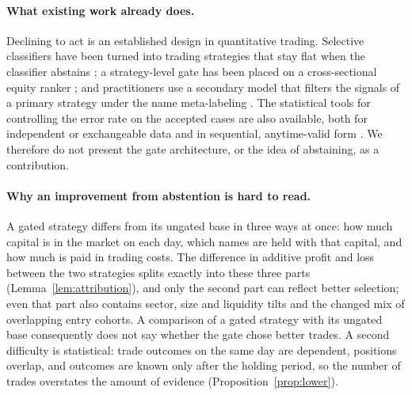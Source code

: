\documentclass[11pt]{article}
\theoremstyle{remark}
\begin{document}
\paragraph{What existing work already does.}
Declining to act is an established design in quantitative trading. Selective classifiers have
been turned into trading strategies that stay flat when the classifier abstains
\citep{pidan2011selective,chalkidis2021trading,nabar2023conservative}; a strategy-level gate has
been placed on a cross-sectional equity ranker \citep{sanderink2026alpha}; and practitioners use
a secondary model that filters the signals of a primary strategy under the name meta-labeling
\citep{joubert2022metalabeling,meyer2023metalabeling}. The statistical tools for controlling the
error rate on the accepted cases are also available, both for independent or exchangeable data
\citep{geifman2017selective,bates2021rcps,angelopoulos2022crc} and in sequential, anytime-valid
form \citep{howard2021timeuniform,ramdas2023savi,xu2024arcps,khosravi2026csa}. We therefore do
not present the gate architecture, or the idea of abstaining, as a contribution.

\paragraph{Why an improvement from abstention is hard to read.}
A gated strategy differs from its ungated base in three ways at once: how much capital is in the
market on each day, which names are held with that capital, and how much is paid in trading
costs. The difference in additive profit and loss between the two strategies splits exactly into
these three parts (Lemma~\ref{lem:attribution}), and only the second part can reflect better
selection; even that part also contains sector, size and liquidity tilts and the changed mix of
overlapping entry cohorts. A comparison of a gated strategy with its ungated base consequently
does not say whether the gate chose better trades. A second difficulty is statistical: trade
outcomes on the same day are dependent, positions overlap, and outcomes are known only after the
holding period, so the number of trades overstates the amount of evidence
(Proposition~\ref{prop:lower}).
\end{document}
